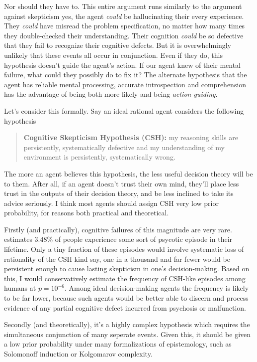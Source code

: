 \documentclass{article}
\begin{document}
Nor should they have to. This entire argument runs similarly to the argument against skepticism \textemdash{} yes, the agent \textit{could} be hallucinating their every experience. They \textit{could} have misread the problem specification, no matter how many times they double-checked their understanding. Their cognition \textit{could} be so defective that they fail to recognize their cognitive defects. But it is overwhelmingly unlikely that these events all occur in conjunction. Even if they do, this hypothesis doesn't guide the agent's action. If our agent knew of their mental failure, what could they possibly do to fix it? The alternate hypothesis \textemdash{} that the agent has reliable mental processing, accurate introspection and comprehension \textemdash{} has the advantage of being both more likely and being \textit{action-guiding}. 

Let's consider this formally. Say an ideal rational agent considers the following hypothesis

\begin{quote}
\textbf{Cognitive Skepticism Hypothesis (CSH):} my reasoning skills are persistently, systematically defective and my understanding of my environment is persistently, systematically wrong.
\end{quote}

The more an agent believes this hypothesis, the less useful decision theory will be to them. After all, if an agent doesn't trust their own mind, they'll place less trust in the outputs of their decision theory, and be less inclined to take its advice seriously. I think most agents should assign CSH very low prior probability, for reasons both practical and theoretical.

Firstly (and practically), cognitive failures of this magnitude are very rare. \citep{perala2007lifetime} estimates 3.48\% of people experience some sort of psycotic episode in their lifetime. Only a tiny fraction of these episodes would involve systematic loss of rationality of the CSH kind \textemdash{} say, one in a thousand \textemdash{} and far fewer would be persistent enough to cause lasting skepticism in one's decision-making. Based on this, I would conservatively estimate the frequency of CSH-like episodes among humans at \(p = 10^{-6}\). Among ideal decision-making agents the frequency is likely to be far lower, because such agents would be better able to discern and process evidence of any partial cognitive defect incurred from psychosis or malfunction.

Secondly (and theoretically), it's a highly complex hypothesis which requires the simultaneous conjunction of many seperate events. Given this, it should be given a low prior probability under many formalizations of epistemology, such as Solomonoff induction or Kolgomarov complexity.
\end{document}
